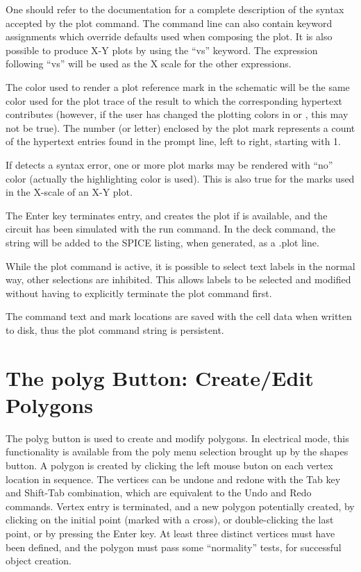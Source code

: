 One should refer to the {\WRspice} documentation for a complete
description of the syntax accepted by the {\cb plot} command.  The
command line can also contain keyword assignments which override
defaults used when composing the plot.  It is also possible to produce
X-Y plots by using the ``{\vt vs}'' keyword.  The expression following
``{\vt vs}'' will be used as the X scale for the other expressions.

The color used to render a plot reference mark in the schematic will
be the same color used for the plot trace of the result to which the
corresponding hypertext contributes (however, if the user has changed
the plotting colors in {\WRspice} or {\Xic}, this may not be true). 
The number (or letter) enclosed by the plot mark represents a count of
the hypertext entries found in the prompt line, left to right,
starting with 1.

If {\Xic} detects a syntax error, one or more plot marks may be
rendered with ``no'' color (actually the highlighting color is used). 
This is also true for the marks used in the X-scale of an X-Y plot.

The {\kb Enter} key terminates entry, and creates the plot if
{\WRspice} is available, and the circuit has been simulated with the
{\cb run} command.  In the {\cb deck} command, the string will be
added to the SPICE listing, when generated, as a {\vt .plot} line.

While the {\cb plot} command is active, it is possible to select text
labels in the normal way, other selections are inhibited.  This
allows labels to be selected and modified without having to
explicitly terminate the {\cb plot} command first.

The command text and mark locations are saved with the cell data when
written to disk, thus the {\cb plot} command string is persistent.


\section{The {\cb polyg} Button: Create/Edit Polygons}

The {\cb polyg} button is used to create and modify polygons.  In
electrical mode, this functionality is available from the {\cb poly}
menu selection brought up by the {\cb shapes} button.  A polygon is
created by clicking the left mouse buton on each vertex location in
sequence.  The vertices can be undone and redone with the {\kb Tab}
key and {\kb Shift-Tab} combination, which are equivalent to the {\cb
Undo} and {\cb Redo} commands.  Vertex entry is terminated, and a new
polygon potentially created, by clicking on the initial point (marked
with a cross), or double-clicking the last point, or by pressing the
{\kb Enter} key.  At least three distinct vertices must have been
defined, and the polygon must pass some ``normality'' tests, for
successful object creation.

